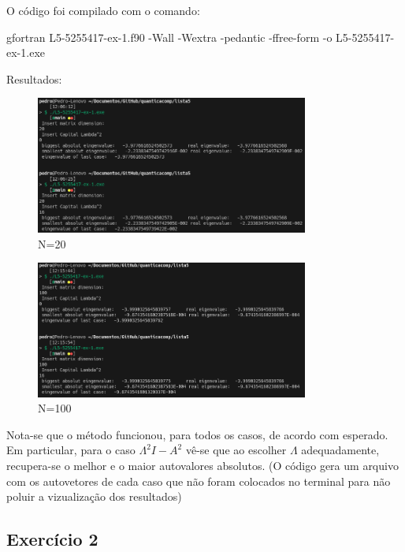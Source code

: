 \documentclass[12pt, a4paper]{article} %
\begin{document}
        O c\'odigo foi compilado com o comando:

    gfortran L5-5255417-ex-1.f90 -Wall -Wextra -pedantic -ffree-form -o L5-5255417-ex-1.exe  

        Resultados:

        \begin{figure}[H]
            \centering
            \includegraphics[width=0.8\textwidth]{../images/ex1-20.png}
            \caption{N=20}
        \end{figure}
        \begin{figure}[H]
            \centering
            \includegraphics[width=0.8\textwidth]{../images/ex1-100.png}
            \caption{N=100}
        \end{figure}

        Nota-se que o método funcionou, para todos os casos, de acordo com esperado. Em particular, para o caso $\Lambda^2 I - A^2$ v\^e-se que ao escolher $\Lambda$ adequadamente, recupera-se o melhor e o maior autovalores absolutos.
        (O c\'odigo gera um arquivo com os autovetores de cada caso que n\~ao foram colocados no terminal para n\~ao poluir a vizualiza\c{c}\~ao dos resultados)

    \subsection{Exercício 2}
\end{document}
